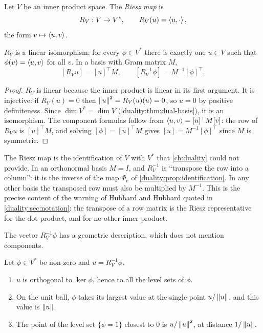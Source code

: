 \begin{notechapter}
\begin{definition}\label{inner-products:def:riesz}
Let $V$ be an inner product space. The \emph{Riesz map} is
\[
  R_V:V\to V^* ,\qquad R_V(u) = \left\langle u, \cdot \right\rangle ,
\]
the form $v\mapsto\left\langle u, v \right\rangle$.
\end{definition}

\begin{theorem}\label{inner-products:thm:riesz}
$R_V$ is a linear isomorphism: for every $\phi\in V^*$ there is exactly one
$u\in V$ such that $\phi(v) = \left\langle u, v \right\rangle$ for all $v$. In a basis with Gram
matrix $M$,
\[
  [R_Vu] = [u]^\top M ,
  \qquad
  [R_V^{-1}\phi] = M^{-1}[\phi]^\top .
\]
\end{theorem}

\begin{proof}
$R_V$ is linear because the inner product is linear in its first argument.
It is injective: if $R_V(u) = 0$ then $\left\|u\right\|^2 = R_V(u)(u) = 0$, so
$u = 0$ by positive definiteness. Since $\dim V^* = \dim V$
(\cref{duality:thm:dual-basis}), it is an isomorphism. The component
formulas follow from $\left\langle u, v \right\rangle = [u]^\top M[v]$: the row of $R_Vu$ is
$[u]^\top M$, and solving $[\phi] = [u]^\top M$ gives
$[u] = M^{-1}[\phi]^\top$ since $M$ is symmetric.
\end{proof}

\begin{intuition}
The Riesz map is the identification of $V$ with $V^*$ that
\cref{ch:duality} could not provide. In an orthonormal basis $M = I$, and
$R_V^{-1}$ is ``transpose the row into a column'': it is the inverse of
the map $\Phi_e$ of \cref{duality:prop:identification}. In any other
basis the transposed
row must also be multiplied by $M^{-1}$. This is the precise content of the
warning of Hubbard and Hubbard quoted in \cref{duality:sec:notation}: the
transpose of a row matrix is the Riesz representative for the dot product,
and for no other inner product.
\end{intuition}

The vector $R_V^{-1}\phi$ has a geometric description, which does not
mention components.

\begin{proposition}
\label{inner-products:prop:riesz-geometry}
Let $\phi\in V^*$ be non-zero and $u = R_V^{-1}\phi$.
\begin{enumerate}[nosep]
  \item $u$ is orthogonal to $\ker\phi$, hence to all the level sets of
        $\phi$.
  \item On the unit ball, $\phi$ takes its largest value at the single
        point $u/\left\|u\right\|$, and this value is $\left\|u\right\|$.
  \item The point of the level set $\{\phi = 1\}$ closest to $0$ is
        $u/\left\|u\right\|^2$, at distance $1/\left\|u\right\|$.
\end{enumerate}
\end{proposition}


\end{notechapter}
